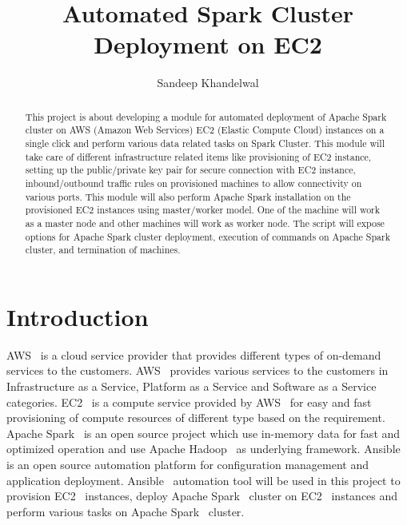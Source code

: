 
\title{Automated Spark Cluster Deployment on EC2}


\author{Sandeep Khandelwal}


\renewcommand{\shortauthors}{Sandeep}


\begin{abstract}

This project is about developing a module for automated deployment of
Apache Spark cluster on AWS (Amazon Web Services) EC2 (Elastic Compute
Cloud) instances on a single click and perform various data related
tasks on Spark Cluster. This module will take care of different infrastructure
related items like provisioning of EC2 instance, setting up the
public/private key pair for secure connection with EC2 instance, inbound/outbound
traffic rules on provisioned machines to allow connectivity on various
ports. This module will also perform Apache Spark installation on the
provisioned EC2 instances using master/worker model. One of the
machine will work as a master node and other machines will work as
worker node. The script will expose options for Apache Spark cluster
deployment, execution of commands on Apache Spark cluster, and
termination of machines.

\end{abstract}



\maketitle

\section{Introduction}

AWS~\cite{hid-sp18-511-www-aws} is a cloud service provider that
provides different types of on-demand services to the
customers. AWS~\cite{hid-sp18-511-www-aws} provides various services
to the customers in Infrastructure as a Service, Platform as a Service
and Software as a Service categories. EC2~\cite{hid-sp18-511-www-ec2}
is a compute service provided by AWS~\cite{hid-sp18-511-www-aws} for
easy and fast provisioning of compute resources of different type
based on the requirement. Apache Spark~\cite{hid-sp18-511-www-spark}
is an open source project which use in-memory data for fast and
optimized operation and use Apache
Hadoop~\cite{hid-sp18-511-www-hadoop} as underlying
framework. Ansible~\cite{hid-sp18-511-www-ansible} is an open source
automation platform for configuration management and application
deployment. Ansible~\cite{hid-sp18-511-www-ansible} automation tool will be used
in this project to provision EC2~\cite{hid-sp18-511-www-ec2} instances, deploy Apache Spark~\cite{hid-sp18-511-www-spark}
cluster on EC2~\cite{hid-sp18-511-www-ec2} instances and perform
various tasks on Apache Spark~\cite{hid-sp18-511-www-spark} cluster.

